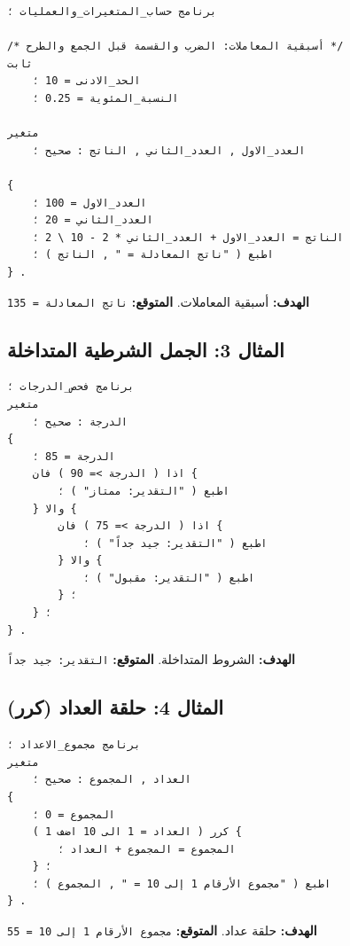 \documentclass[12pt,a4paper]{report}
\newcommand{\filename}[1]{\textcolor{SecondaryBlue}{\texttt{#1}}}
\begin{document}
\begin{CodeBox}[title={المثال 1 — \filename{01\_طباعة\_ومتغيرات.arb}}]
\begin{lstlisting}[style=ArabicCodeStyle]
برنامج حساب_المتغيرات_والعمليات ؛

/* أسبقية المعاملات: الضرب والقسمة قبل الجمع والطرح */
ثابت
    الحد_الادنى = 10 ؛
    النسبة_المئوية = 0.25 ؛

متغير
    العدد_الاول , العدد_الثاني , الناتج : صحيح ؛

{
    العدد_الاول = 100 ؛
    العدد_الثاني = 20 ؛
    الناتج = العدد_الاول + العدد_الثاني * 2 - 10 \ 2 ؛
    اطبع ( "ناتج المعادلة = " , الناتج ) ؛
} .
\end{lstlisting}
\end{CodeBox}
\textbf{\arabicfont الهدف:} أسبقية المعاملات. \quad \textbf{\arabicfont المتوقع:} \texttt{ناتج المعادلة = 135}

\subsection{المثال 3: الجمل الشرطية المتداخلة}

\begin{CodeBox}[title={المثال 3 — \filename{03\_الجمل\_الشرطية.arb}}]
\begin{lstlisting}[style=ArabicCodeStyle]
برنامج فحص_الدرجات ؛
متغير
    الدرجة : صحيح ؛
{
    الدرجة = 85 ؛
    اذا ( الدرجة >= 90 ) فان {
        اطبع ( "التقدير: ممتاز" ) ؛
    } والا {
        اذا ( الدرجة >= 75 ) فان {
            اطبع ( "التقدير: جيد جداً" ) ؛
        } والا {
            اطبع ( "التقدير: مقبول" ) ؛
        } ؛
    } ؛
} .
\end{lstlisting}
\end{CodeBox}
\textbf{\arabicfont الهدف:} الشروط المتداخلة. \quad \textbf{\arabicfont المتوقع:} \texttt{التقدير: جيد جداً}

\subsection{المثال 4: حلقة العداد (كرر)}

\begin{CodeBox}[title={المثال 4 — \filename{04\_حلقة\_العداد\_كرر.arb}}]
\begin{lstlisting}[style=ArabicCodeStyle]
برنامج مجموع_الاعداد ؛
متغير
    العداد , المجموع : صحيح ؛
{
    المجموع = 0 ؛
    كرر ( العداد = 1 الى 10 اضف 1 ) {
        المجموع = المجموع + العداد ؛
    } ؛
    اطبع ( "مجموع الأرقام 1 إلى 10 = " , المجموع ) ؛
} .
\end{lstlisting}
\end{CodeBox}
\textbf{\arabicfont الهدف:} حلقة عداد. \quad \textbf{\arabicfont المتوقع:} \texttt{مجموع الأرقام 1 إلى 10 = 55}
\end{document}
